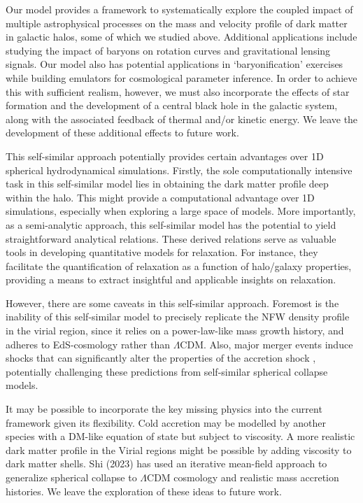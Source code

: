 Our model provides a framework to systematically explore the coupled impact of multiple astrophysical processes on the mass and velocity profile of dark matter in galactic halos, some of which we studied above. 
Additional applications include studying the impact of baryons on rotation curves and gravitational lensing signals.
Our model also has potential applications in `baryonification' exercises while building emulators for cosmological parameter inference.
In order to achieve this with sufficient realism, however, we must also incorporate the effects of star formation and the development of a central black hole in the galactic system, along with the associated feedback of thermal and/or kinetic energy. We leave the development of these additional effects to future work.

This self-similar approach potentially provides certain advantages over 1D spherical hydrodynamical simulations. Firstly, the sole computationally intensive task in this self-similar model lies in obtaining the dark matter profile deep within the halo. This might provide a computational advantage over 1D simulations, especially when exploring a large space of models. More importantly, as a semi-analytic approach, this self-similar model has the potential to yield straightforward analytical relations. These derived relations serve as valuable tools in developing quantitative models for relaxation. For instance, they facilitate the quantification of relaxation as a function of halo/galaxy properties, providing a means to extract insightful and applicable insights on relaxation.

However, there are some caveats in this self-similar approach.
Foremost is the inability of this self-similar model to precisely replicate the NFW density profile in the virial region, since it relies on a power-law-like mass growth history, and adheres to EdS-cosmology rather than $\Lambda$CDM.
Also, major merger events induce shocks that can significantly alter the properties of the accretion shock \cite{2020Zhang_etal_merger_shocks,2020ShiNagai_etal_merger_shocks}, potentially challenging these predictions from self-similar spherical collapse models.

It may be possible to incorporate the key missing physics into the current framework given its flexibility. Cold accretion may be modelled by another species with a DM-like equation of state but subject to viscosity. A more realistic dark matter profile in the Virial regions might be possible by adding viscosity to dark matter shells. Shi (2023) \cite{2023Shi_iter_approach} has used an iterative mean-field approach to generalize spherical collapse to $\Lambda$CDM cosmology and realistic mass accretion histories. We leave the exploration of these ideas to future work.
